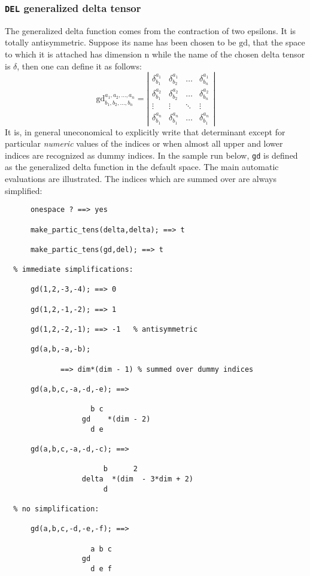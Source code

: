 \subsubsection{\texttt{DEL} generalized delta tensor}
The generalized delta function comes from the contraction of two epsilons.
It is totally antisymmetric. Suppose its name has been chosen to be $\mathrm{gd}$,
that the space to which it is
attached has dimension n  while the name of the chosen delta tensor
is $\delta$, then
one can define it as follows:
\[
\mathrm{gd}^{a_1,a_2,\ldots,a_n}_{b_1,b_2,\ldots, b_n}=
\left|\begin{array}{cccc}
	\delta^{a_1}_{b_1}  & \delta^{a_1}_{b_2} & \ldots & \delta^{a_1}_{b_n}  \\
	\delta^{a_2}_{b_1} & \delta^{a_2}_{b_2} & \ldots & \delta^{a_2}_{b_n} \\
        \vdots & \vdots & \ddots & \vdots \\
        \delta^{a_n}_{b_1} & \delta^{a_n}_{b_1} & \ldots & \delta^{a_n}_{b_1}
 \end{array}
\right|
\]
It is, in general uneconomical to explicitly write that determinant except
for particular \emph{numeric}  values of the indices
%
%
 or when almost all
upper and lower indices are recognized as dummy indices.
In the sample run below, \texttt{gd} is defined as the generalized delta function
in the default space. The main automatic evaluations are illustrated.
The indices which are summed over are always simplified:
\begin{verbatim}
      onespace ? ==> yes

      make_partic_tens(delta,delta); ==> t

      make_partic_tens(gd,del); ==> t

  % immediate simplifications:

      gd(1,2,-3,-4); ==> 0

      gd(1,2,-1,-2); ==> 1

      gd(1,2,-2,-1); ==> -1   % antisymmetric

      gd(a,b,-a,-b);

             ==> dim*(dim - 1) % summed over dummy indices

      gd(a,b,c,-a,-d,-e); ==>

                    b c
                  gd    *(dim - 2)
                    d e

      gd(a,b,c,-a,-d,-c); ==>

                       b      2
                  delta  *(dim  - 3*dim + 2)
                       d

  % no simplification:

      gd(a,b,c,-d,-e,-f); ==>

                    a b c
                  gd
                    d e f
\end{verbatim}
